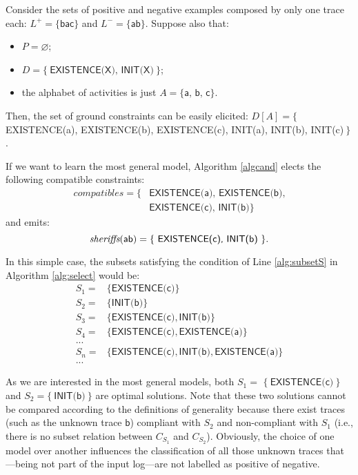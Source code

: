 \begin{example}
Consider the sets of positive and negative examples composed by only one trace each: $L^+=\{\textsf{bac}\}$ and $L^-=\{\textsf{ab}\}$. Suppose also that:
\begin{itemize}
\item $P=\varnothing$;
\item $D=\{\ \textsf{EXISTENCE(X), INIT(X)}\ \}$;
\item the alphabet of activities is just $A=\{\textsf{a, b, c}\}$.
\end{itemize}
%
Then, the set of ground constraints can be easily elicited: $D[A]=\{$ \textsf{EXISTENCE(a), EXISTENCE(b), EXISTENCE(c), INIT(a), INIT(b), INIT(c)}$\ \}$.

If we want to learn the most general model, Algorithm \ref{algcand} elects the following compatible constraints:
\begin{align*}
	{compatibles}=\{ & \textsf{EXISTENCE(a), EXISTENCE(b)},\\
	& \textsf{EXISTENCE(c), INIT(b)}\}
\end{align*}
\noindent and emits:
$$\textit{\sheriff}(\textsf{ab})=\{\ \textsf{EXISTENCE(c), INIT(b)}\ \}.$$

In this simple case, the subsets satisfying the condition of Line \ref{alg:subsetS} in Algorithm \ref{alg:select} would be: 
\begin{align*}
 S_1= &  \{\textsf{EXISTENCE(c)}\}  \\
 S_2= &  \{\textsf{INIT(b)}\}   \\
 S_3= &  \{\textsf{EXISTENCE(c)}, \textsf{INIT(b)}\} \\
 S_4= & \{\textsf{EXISTENCE(c)}, \textsf{EXISTENCE(a)}\} \\
  ... & \\
 S_n= & \{\textsf{EXISTENCE(c)}, \textsf{INIT(b)}, \textsf{EXISTENCE(a)}\} \\
 ... &
\end{align*}

As we are interested in the most general models, both $S_1=$ $\{\ \textsf{EXISTENCE(c)}\ \}$ and $S_2=\{\ \textsf{INIT(b)}\ \}$ are optimal solutions. Note that these two solutions cannot be compared according to the definitions of generality because there exist traces (such as the unknown trace $\textsf{b}$) compliant with $S_2$ and non-compliant with $S_1$ (i.e., there is no subset relation between ${C}_{S_1}$ and ${C}_{S_2}$).
Obviously, the choice of one model over another influences the classification of all those unknown traces that---being not part of the input log---are not labelled as positive of negative.


\end{example}
